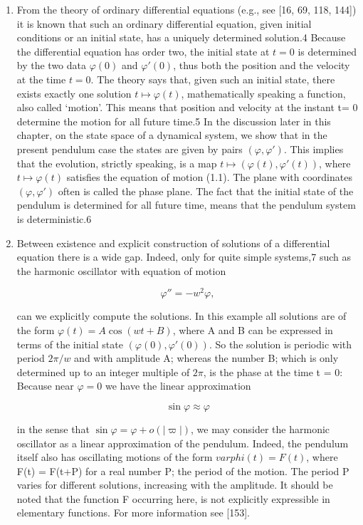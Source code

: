 \documentclass[12pt]{article}
\begin{document}
\begin{enumerate}
\item From the theory of ordinary differential equations (e.g., see [16, 69, 118, 144])
it is known that such an ordinary differential equation, given initial conditions
or an initial state, has a uniquely determined solution.4 Because the differential
equation has order two, the initial state at $t=0$ is determined by the two
data $\varphi(0)$ and $\varphi'(0)$, thus both the position and the velocity at the time $t=0$.
The theory says that, given such an initial state, there exists exactly one solution
$t \mapsto \varphi(t)$, mathematically speaking a function, also called ‘motion’. This
means that position and velocity at the instant t= 0 determine the motion for
all future time.5 In the discussion later in this chapter, on the state space of a
dynamical system, we show that in the present pendulum case the states are
given by pairs $(\varphi, \varphi')$. This implies that the evolution, strictly speaking, is a map
$t \mapsto (\varphi(t), \varphi'(t))$, where $t \mapsto \varphi(t)$ satisfies the equation of motion (1.1). The
plane with coordinates $(\varphi, \varphi')$ often is called the phase plane. The fact that the
initial state of the pendulum is determined for all future time, means that the
pendulum system is deterministic.6

\item Between existence and explicit construction of solutions of a differential equation
there is a wide gap. Indeed, only for quite simple systems,7 such as the harmonic
oscillator with equation of motion

\[
\varphi'' = -w^2 \varphi,
\]

can we explicitly compute the solutions. In this example all solutions are of the
form $\varphi(t) =  A \cos(w t + B)$, where A and B can be expressed in terms of the
initial state $(\varphi(0), \varphi'(0))$. So the solution is periodic with period $2\pi/w$ and with
amplitude A; whereas the number B; which is only determined up to an integer
multiple of $2\pi$, is the phase at the time t = 0: Because near $\varphi = 0$ we have the
linear approximation

\[
\sin \varphi \approx \varphi
\]

in the sense that $\sin \varphi = \varphi+ o(|\varpi|)$, we may consider the harmonic oscillator
as a linear approximation of the pendulum. Indeed, the pendulum itself also has
oscillating motions of the form $varphi(t) = F(t)$, where F(t) = F(t+P) for
a real number P; the period of the motion. The period P varies for different
solutions, increasing with the amplitude. It should be noted that the function F
occurring here, is not explicitly expressible in elementary functions. For more
information see [153].


\end{enumerate}
\end{document}
